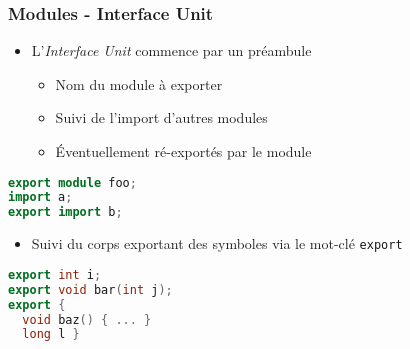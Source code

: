 \documentclass[C++.tex]{subfiles}
\begin{document}
\begin{frame}[fragile]
	\frametitle{Modules - Interface Unit}
	\begin{itemize}
		\item L'\textit{Interface Unit} commence par un préambule
		\begin{itemize}
			\item Nom du module à exporter
			\item Suivi de l'import d'autres modules
			\item Éventuellement ré-exportés par le module
		\end{itemize}
	\end{itemize}

	\begin{lstlisting}[language=C++]
export module foo;
import a;
export import b;\end{lstlisting}

	\begin{itemize}
		\item Suivi du corps exportant des symboles via le mot-clé \lstinline|export|
	\end{itemize}


	\begin{lstlisting}[language=C++]
export int i;
export void bar(int j);
export {
  void baz() { ... }
  long l }\end{lstlisting}
\end{frame}
\end{document}

